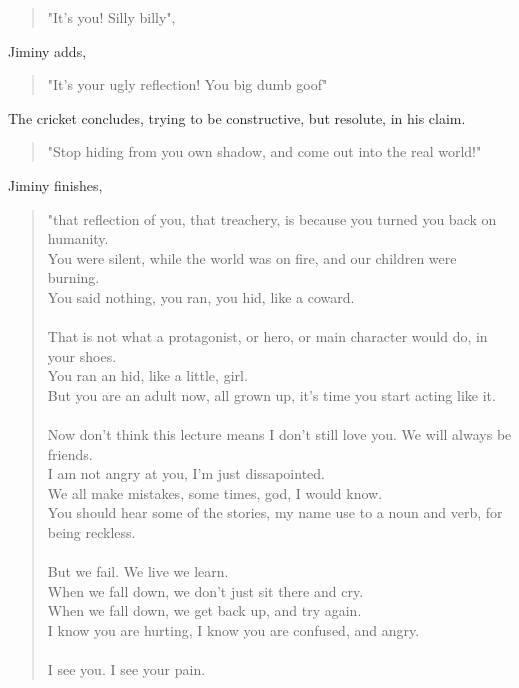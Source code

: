 \documentclass[16pt,openany,oneside]{book}
\begin{document}
\begin{quote}
  "It's you! Silly billy", 
\end{quote}

Jiminy adds,

\begin{quote}  
  "It's your ugly reflection! You big dumb goof" 
\end{quote}

The cricket concludes, trying to be constructive, but resolute, in his claim.

\begin{quote}
  "Stop hiding from you own shadow, and come out into the real world!"
\end{quote}

Jiminy finishes,

\begin{quote}
    "that reflection of you, that treachery, is because you turned you back on humanity. \\
    You were silent, while the world was on fire, and our children were burning. \\
    You said nothing, you ran, you hid, like a coward.
    \\\\
    That is not what a protagonist, or hero, or main character would do, in your shoes. \\
    You ran an hid, like a little, girl. \\
    But you are an adult now, all grown up, it's time you start acting like it.
    \\\\
    Now don't think this lecture means I don't still love you. We will always be friends. \\
    I am not angry at you, I'm just dissapointed. \\
    We all make mistakes, some times, god, I would know. \\
    You should hear some of the stories, my name use to a noun and verb, for being reckless.
    \\\\
    But we fail. We live we learn. \\
    When we fall down, we don't just sit there and cry. \\
    When we fall down, we get back up, and try again. \\
    I know you are hurting, I know you are confused, and angry.
    \\\\
    I see you. I see your pain. \\

\end{quote}
\end{document}
